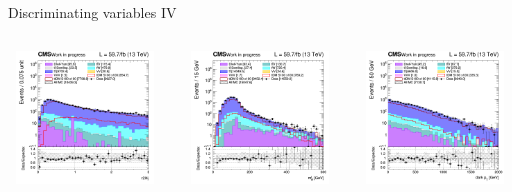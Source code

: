 \documentclass[8pt]{beamer}
\begin{document}
\begin{frame}{Discriminating variables IV}
\begin{columns}
\begin{column}{0.33\textwidth}
\begin{center}
    		\end{center}		
		\end{column}
\end{columns}
\begin{columns}
		\begin{column}{0.33\textwidth}
			\begin{center}
     			\includegraphics[width=1.0\textwidth, height=100pt]{figs/2018/SmearSR-ttDM-scalar100/log_cratio_topCR_ll_r2l4j.png}
    		\end{center}		
		\end{column}
		\begin{column}{0.33\textwidth}
			\begin{center}
     			\includegraphics[width=1.0\textwidth, height=100pt]{figs/2018/SmearSR-ttDM-scalar100/log_cratio_topCR_ll_mblt.png}
    		\end{center}		
		\end{column}
		\begin{column}{0.33\textwidth}
			\begin{center}
     			\includegraphics[width=1.0\textwidth, height=100pt]{figs/2018/SmearSR-ttDM-scalar100/log_cratio_topCR_ll_dark_pt.png}
    		\end{center}		
		\end{column}
\end{columns} \vfill
\end{frame}
\end{document}
